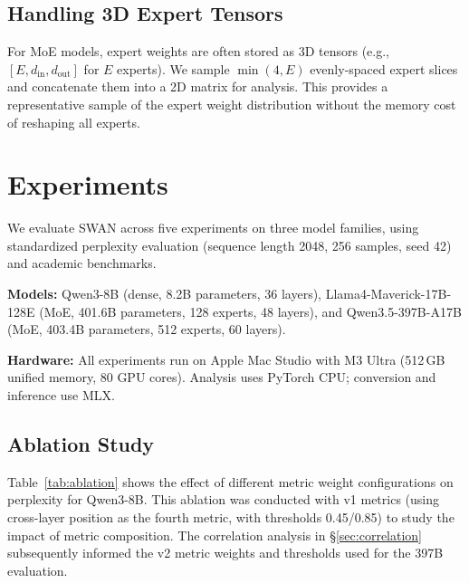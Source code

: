 \documentclass{article}
\begin{document}
\subsection{Handling 3D Expert Tensors}

For MoE models, expert weights are often stored as 3D tensors (e.g., $[E, d_{\text{in}}, d_{\text{out}}]$ for $E$ experts). We sample $\min(4, E)$ evenly-spaced expert slices and concatenate them into a 2D matrix for analysis. This provides a representative sample of the expert weight distribution without the memory cost of reshaping all experts.

\section{Experiments}
\label{sec:experiments}

We evaluate SWAN across five experiments on three model families, using standardized perplexity evaluation (sequence length 2048, 256 samples, seed 42) and academic benchmarks.

\textbf{Models:} Qwen3-8B (dense, 8.2B parameters, 36 layers), Llama4-Maverick-17B-128E (MoE, 401.6B parameters, 128 experts, 48 layers), and Qwen3.5-397B-A17B (MoE, 403.4B parameters, 512 experts, 60 layers).

\textbf{Hardware:} All experiments run on Apple Mac Studio with M3 Ultra (512\,GB unified memory, 80 GPU cores). Analysis uses PyTorch CPU; conversion and inference use MLX.

\subsection{Ablation Study}
\label{sec:ablation}



Table~\ref{tab:ablation} shows the effect of different metric weight configurations on perplexity for Qwen3-8B. This ablation was conducted with v1 metrics (using cross-layer position as the fourth metric, with thresholds 0.45/0.85) to study the impact of metric composition. The correlation analysis in \S\ref{sec:correlation} subsequently informed the v2 metric weights and thresholds used for the 397B evaluation.
\end{document}
